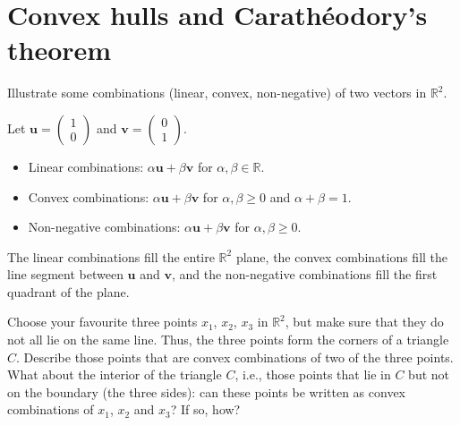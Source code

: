 \section{Convex hulls and Carathéodory's theorem}

\begin{exercise}
  Illustrate some combinations (linear, convex, non-negative) of two vectors in $\mathbb{R}^2$.
\end{exercise}

\begin{solution}
  Let $\mathbf{u} =
  \begin{pmatrix} 1 \\ 0
  \end{pmatrix}$ and $\mathbf{v} =
  \begin{pmatrix} 0 \\ 1
  \end{pmatrix}$.
  \begin{itemize}
    \item Linear combinations: $\alpha \mathbf{u} + \beta \mathbf{v}$ for $\alpha, \beta \in \mathbb{R}$.
    \item Convex combinations: $\alpha \mathbf{u} + \beta \mathbf{v}$ for $\alpha, \beta \geq 0$ and $\alpha + \beta = 1$.
    \item Non-negative combinations: $\alpha \mathbf{u} + \beta \mathbf{v}$ for $\alpha, \beta \geq 0$.
  \end{itemize}
  The linear combinations fill the entire $\mathbb{R}^2$ plane, the convex combinations fill the line segment between $\mathbf{u}$ and $\mathbf{v}$, and the non-negative combinations fill the first quadrant of the plane.
\end{solution}

\begin{exercise}
  Choose your favourite three points $x_1$, $x_2$, $x_3$ in $\mathbb{R}^2$, but make sure that they do not all lie on the same line.
  Thus, the three points form the corners of a triangle $C$.
  Describe those points that are convex combinations of two of the three points.
  What about the interior of the triangle $C$, i.e., those points that lie in $C$ but not on the boundary (the three sides): can these points be written as convex combinations of $x_1$, $x_2$ and $x_3$? If so, how?
\end{exercise}

